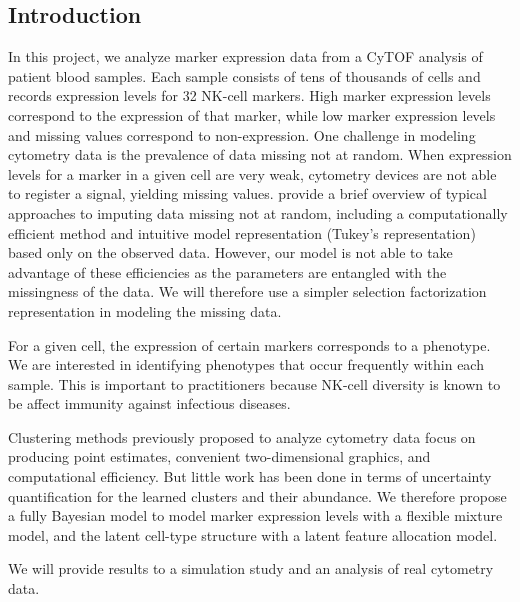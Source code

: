 \documentclass[12pt,]{article}
\begin{document}
\subsection{Introduction}


In this project, we analyze marker expression data from a CyTOF analysis of
patient blood samples. Each sample consists of tens of thousands of cells and
records expression levels for 32 NK-cell markers. High marker expression levels
correspond to the expression of that marker, while low marker expression levels
and missing values correspond to non-expression. One challenge in modeling
cytometry data is the prevalence of data missing not at random. When expression
levels for a marker in a given cell are very weak, cytometry devices are not
able to register a signal, yielding missing values. \cite{franks2016non}
provide a brief overview of typical approaches to imputing data missing not at
random, including a computationally efficient method and intuitive model
representation (Tukey's representation) based only on the observed data. 
However, our model is not able to take advantage of these efficiencies 
as the parameters are entangled with the missingness of the data.
We will therefore use a simpler selection factorization
\citep{rubin1974characterizing} representation in modeling the missing data.

For a given cell, the expression of certain markers corresponds to a phenotype.
We are interested in identifying phenotypes that occur frequently within each
sample. This is important to practitioners because NK-cell diversity is known
to be affect immunity against infectious diseases. 

Clustering methods previously proposed to analyze cytometry data focus on
producing point estimates, convenient two-dimensional graphics, and
computational efficiency. But little work has been done in terms of uncertainty
quantification for the learned clusters and their abundance.  We therefore
propose a fully Bayesian model to model marker expression levels with a
flexible mixture model, and the latent cell-type structure with a latent
feature allocation model.

We will provide results to a simulation study and an analysis of real cytometry
data.

\end{document}
